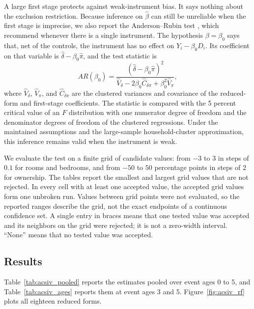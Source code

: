 A large first stage protects against weak-instrument bias. It says nothing about
the exclusion restriction. Because inference on $\hat\beta$ can still be unreliable
when the first stage is imprecise, we also report the Anderson--Rubin test
\citep{anderson1949estimation}, which \citet[p.~3]{andrews2018weak} recommend
whenever there is a single instrument. The hypothesis $\beta=\beta_0$ says that, net
of the controls, the instrument has no effect on $Y_i-\beta_0D_i$. Its coefficient
on that variable is $\hat\delta-\beta_0\hat\pi$, and the test statistic is
\begin{equation}
AR(\beta_0)=\frac{(\hat\delta-\beta_0\hat\pi)^2}
{\hat V_\delta-2\beta_0\hat C_{\delta\pi}+\beta_0^2\hat V_\pi},
\label{eq:acsiv_ar}
\end{equation}
where $\hat V_\delta$, $\hat V_\pi$, and $\hat C_{\delta\pi}$ are the clustered
variances and covariance of the reduced-form and first-stage coefficients. The
statistic is compared with the 5 percent critical value of an $F$ distribution with
one numerator degree of freedom and the denominator degrees of freedom of the
clustered regressions. Under the maintained assumptions and the large-sample
household-cluster approximation, this inference remains valid when the instrument
is weak.

We evaluate the test on a finite grid of candidate values: from $-3$ to $3$ in
steps of $0.1$ for rooms and bedrooms, and from $-50$ to $50$ percentage points in
steps of $2$ for ownership. The tables report the smallest and largest grid values
that are not rejected. In every cell with at least one accepted value, the accepted
grid values form one unbroken run. Values between grid points were not evaluated,
so the reported ranges describe the grid, not the exact endpoints of a continuous
confidence set. A single entry in braces means that one tested value was accepted
and its neighbors on the grid were rejected; it is not a zero-width interval.
``None'' means that no tested value was accepted.

\subsection{Results}
\label{app:acs_iv_results}

Table~\ref{tab:acsiv_pooled} reports the estimates pooled over event ages 0 to 5,
and Table~\ref{tab:acsiv_ages} reports them at event ages 3 and 5.
Figure~\ref{fig:acsiv_rf} plots all eighteen reduced forms.

